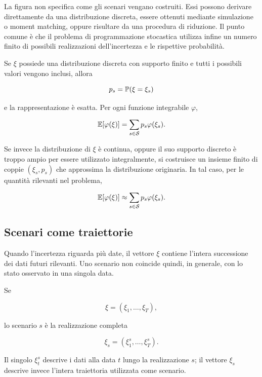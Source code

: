 La figura non specifica come gli scenari vengano costruiti. Essi possono
derivare direttamente da una distribuzione discreta, essere ottenuti
mediante simulazione o moment matching, oppure risultare da una
procedura di riduzione. Il punto comune \`e che il problema di
programmazione stocastica utilizza infine un numero finito di possibili
realizzazioni dell'incertezza e le rispettive probabilit\`a.

Se $\xi$ possiede una distribuzione discreta con supporto finito e tutti i
possibili valori vengono inclusi, allora

\[
p_s=\mathbb{P}(\xi=\xi_s)
\]

\noindent e la rappresentazione \`e esatta. Per ogni funzione integrabile $\varphi$,

\begin{equation}
\mathbb{E}[\varphi(\xi)]
=
\sum_{s\in\mathcal S}p_s\varphi(\xi_s).
\label{eq:cap14-attesa-scenari}
\end{equation}

Se invece la distribuzione di $\xi$ \`e continua, oppure il suo supporto
discreto \`e troppo ampio per essere utilizzato integralmente, si costruisce
un insieme finito di coppie $(\xi_s,p_s)$ che approssima la distribuzione
originaria. In tal caso, per le quantit\`a rilevanti nel problema,

\[
\mathbb{E}[\varphi(\xi)]
\approx
\sum_{s\in\mathcal S}p_s\varphi(\xi_s).
\]

\subsection{Scenari come traiettorie}

Quando l'incertezza riguarda pi\`u date, il vettore $\xi$ contiene l'intera
successione dei dati futuri rilevanti. Uno scenario non coincide quindi, in
generale, con lo stato osservato in una singola data.

Se

\[
\xi=(\xi_1,\ldots,\xi_T),
\]

\noindent lo scenario $s$ \`e la realizzazione completa

\begin{equation}
\xi_s=
\left(
\xi_1^s,\ldots,\xi_T^s
\right).
\label{eq:cap14-scenario-traiettoria}
\end{equation}

Il singolo $\xi_t^s$ descrive i dati alla data $t$ lungo la realizzazione
$s$; il vettore $\xi_s$ descrive invece l'intera traiettoria utilizzata come
scenario.

